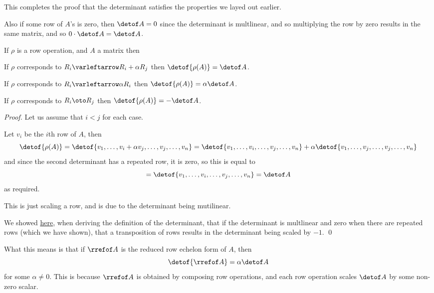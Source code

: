 This completes the proof that the determinant satisfies the properties we layed out earlier.

Also if some row of $A$'s is zero, then $\detof A=0$ since the determinant is multlinear, and so multiplying the row by zero results in the same matrix, and so $0\cdot\detof A=\detof A$.

\begin{prop*}

    If $\rho$ is a row operation, and $A$ a matrix then
    \blist
        \item If $\rho$ corresponds to $R_i\varleftarrow R_i+\alpha R_j$ then $\detof{\rho(A)}=\detof A$.
        \item If $\rho$ corresponds to $R_i\varleftarrow \alpha R_i$ then $\detof{\rho(A)}=\alpha\detof A$.
        \item If $\rho$ corresponds to $R_i\oto R_j$ then $\detof{\rho(A)}=-\detof A$.
    \elist

\end{prop*}

\begin{proof}

    Let us assume that $i<j$ for each case.

    \blist
        \item Let $v_i$ be the $i$th row of $A$, then
        \[ \detof{\rho(A)} = \detof{v_1,\dots,v_i+\alpha v_j,\dots,v_j,\dots,v_n} = \detof{v_1,\dots,v_i,\dots,v_j,\dots,v_n} + \alpha\detof{v_1,\dots,v_j,\dots,v_j,\dots,v_n} \]
        and since the second determinant has a repeated row, it is zero, so this is equal to
        \[ = \detof{v_1,\dots,v_i,\dots,v_j,\dots,v_n} = \detof A \]
        as required.

        \item This is just scaling a row, and is due to the determinant being mutilinear.

        \item We showed \hyperlink{proof:detTransposition}{here}, when deriving the definition of the determinant, that if the determinant is multlinear and zero when there are repeated rows (which we have
        shown), that a transposition of rows results in the determinant being scaled by $-1$.
        \qed
    \elist

\end{proof}

What this means is that if $\rrefof A$ is the reduced row echelon form of $A$, then
\[ \detof{\rrefof A} = \alpha\detof A \]
for some $\alpha\neq0$.
This is because $\rrefof A$ is obtained by composing row operations, and each row operation scales $\detof A$ by some non-zero scalar.

